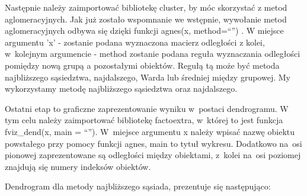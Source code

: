 \documentclass[12pt,a4paper]{report}
\begin{document}
{\begin{Shaded}
\begin{Highlighting}[]
\StringTok{ }\NormalTok{(dane_porzadkowanie[,}\NormalTok{(}\NormalTok{,}\NormalTok{,}
            \NormalTok{,}\NormalTok{,}\NormalTok{)],                                           } \NormalTok{)}
\end{Highlighting}
\end{Shaded}

Następnie należy zaimportować bibliotekę cluster, by móc skorzystać z
metod aglomeracyjnych. Jak już zostało wspomnanie we wstępnie, wywołanie
metod aglomeracyjnych odbywa się dzięki funkcji agnes(x, method=``'') .
W miejsce argumentu 'x' - zostanie podana wyznaczona macierz odległości z
kolei, w~kolejnym argumencie - method zostanie podana reguła wyznaczania
odległości pomiędzy nową grupą a pozostałymi obiektów. Regułą tą może
być metoda najbliższego sąsiedztwa, najdalszego, Warda lub średniej
między grupowej. My wykorzystamy metodę najbliższego sąsiedztwa oraz
najdalszego.

\begin{Shaded}
\begin{Highlighting}[]
\StringTok{ } \NormalTok{)}
\StringTok{ } \NormalTok{)}
\end{Highlighting}
\end{Shaded}

Ostatni etap to graficzne zaprezentowanie wyniku w~postaci dendrogramu.
W tym celu należy zaimportować bibliotekę factoextra, w~której to jest
funkcja fviz\_dend(x, main = ``''). W~miejsce argumentu x należy wpisać
nazwę obiektu powstałego przy pomocy funkcji agnes, main to tytuł
wykresu. Dodatkowo na~osi pionowej zaprezentowane są odległości między
obiektami, z~kolei na~osi poziomej znajdują się numery indeksów
obiektów.

Dendrogram dla metody najbliższego sąsiada, prezentuje się następująco:

\begin{Shaded}
\begin{Highlighting}[]
\NormalTok{, }\NormalTok{, }
 \NormalTok{)}
\end{Highlighting}
\end{Shaded}

}
\end{document}
